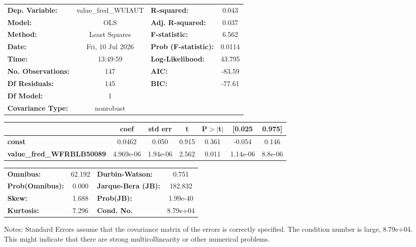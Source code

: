 \begin{center}
\begin{tabular}{lclc}
\toprule
\textbf{Dep. Variable:}           & value\_fred\_WUIAUT & \textbf{  R-squared:         } &     0.043   \\
\textbf{Model:}                   &         OLS         & \textbf{  Adj. R-squared:    } &     0.037   \\
\textbf{Method:}                  &    Least Squares    & \textbf{  F-statistic:       } &     6.562   \\
\textbf{Date:}                    &   Fri, 10 Jul 2026  & \textbf{  Prob (F-statistic):} &   0.0114    \\
\textbf{Time:}                    &       13:49:59      & \textbf{  Log-Likelihood:    } &    43.795   \\
\textbf{No. Observations:}        &           147       & \textbf{  AIC:               } &    -83.59   \\
\textbf{Df Residuals:}            &           145       & \textbf{  BIC:               } &    -77.61   \\
\textbf{Df Model:}                &             1       & \textbf{                     } &             \\
\textbf{Covariance Type:}         &      nonrobust      & \textbf{                     } &             \\
\bottomrule
\end{tabular}
\begin{tabular}{lcccccc}
                                  & \textbf{coef} & \textbf{std err} & \textbf{t} & \textbf{P$> |$t$|$} & \textbf{[0.025} & \textbf{0.975]}  \\
\midrule
\textbf{const}                    &       0.0462  &        0.050     &     0.915  &         0.361        &       -0.054    &        0.146     \\
\textbf{value\_fred\_WFRBLB50089} &    4.969e-06  &     1.94e-06     &     2.562  &         0.011        &     1.14e-06    &      8.8e-06     \\
\bottomrule
\end{tabular}
\begin{tabular}{lclc}
\textbf{Omnibus:}       & 62.192 & \textbf{  Durbin-Watson:     } &    0.751  \\
\textbf{Prob(Omnibus):} &  0.000 & \textbf{  Jarque-Bera (JB):  } &  182.832  \\
\textbf{Skew:}          &  1.688 & \textbf{  Prob(JB):          } & 1.99e-40  \\
\textbf{Kurtosis:}      &  7.296 & \textbf{  Cond. No.          } & 8.79e+04  \\
\bottomrule
\end{tabular}
\end{center}

Notes: \newline
 [1] Standard Errors assume that the covariance matrix of the errors is correctly specified. \newline
 [2] The condition number is large, 8.79e+04. This might indicate that there are \newline
 strong multicollinearity or other numerical problems.